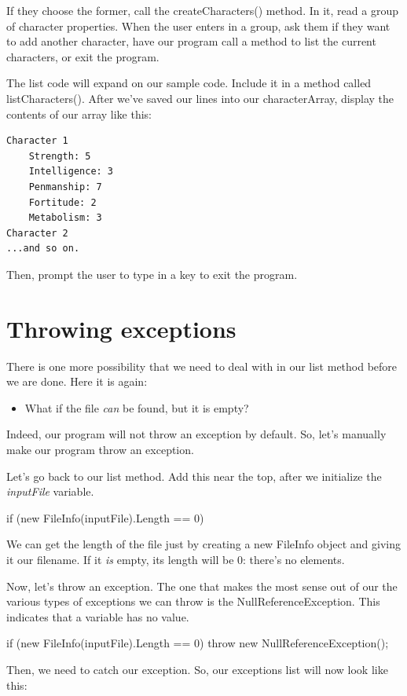 \documentclass[oneside, openany] {book}
\begin{document}
If they choose the former, call the createCharacters() method. In it, read a group of character properties. When the user enters in a group, ask them if they want to add another character, have our program call a method to list the current characters, or exit the program.

The list code will expand on our sample code. Include it in a method called listCharacters(). After we've saved our lines into our characterArray, display the contents of our array like this:
\begin{verbatim}
Character 1
    Strength: 5
    Intelligence: 3
    Penmanship: 7
    Fortitude: 2
    Metabolism: 3
Character 2
...and so on.
\end{verbatim}
Then, prompt the user to type in a key to exit the program.
\section{Throwing exceptions}
There is one more possibility that we need to deal with in our list method before we are done. Here it is again:
\begin{itemize}
    \item What if the file \emph{can} be found, but it is empty?
\end{itemize}
Indeed, our program will not throw an exception by default. So, let's manually make our program throw an exception.

Let's go back to our list method. Add this near the top, after we initialize the \emph{inputFile} variable.
\begin{CSharp}

if (new FileInfo(inputFile).Length == 0)
{
}
\end{CSharp}
We can get the length of the file just by creating a new FileInfo object and giving it our filename. If it \emph{is} empty, its length will be 0: there's no elements.

Now, let's throw an exception. The one that makes the most sense out of our the various types of exceptions we can throw is the NullReferenceException. This indicates that a variable has no value.

\begin{CSharp}
if (new FileInfo(inputFile).Length == 0)
{
  throw new NullReferenceException();
}
\end{CSharp}

Then, we need to catch our exception. So, our exceptions list will now look like this:
\end{document}
